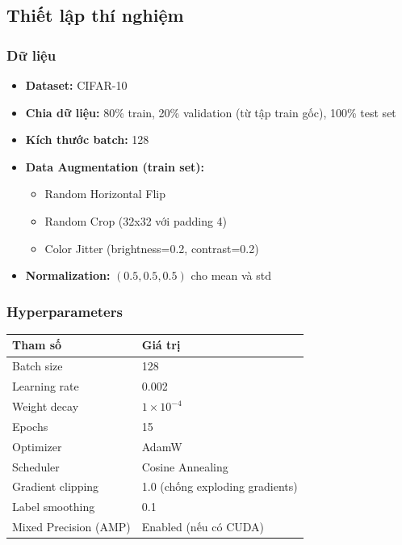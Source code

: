 \subsection{Thiết lập thí nghiệm}

\subsubsection{Dữ liệu}

\begin{itemize}
    \item \textbf{Dataset:} CIFAR-10
    \item \textbf{Chia dữ liệu:} 80\% train, 20\% validation (từ tập train gốc), 100\% test set
    \item \textbf{Kích thước batch:} 128
    \item \textbf{Data Augmentation (train set):}
    \begin{itemize}
        \item Random Horizontal Flip
        \item Random Crop (32x32 với padding 4)
        \item Color Jitter (brightness=0.2, contrast=0.2)
    \end{itemize}
    \item \textbf{Normalization:} $(0.5, 0.5, 0.5)$ cho mean và std
\end{itemize}

\subsubsection{Hyperparameters}

\begin{table}[H]
    \centering
    \begin{tabular}{ll}
        \toprule
        \textbf{Tham số} & \textbf{Giá trị} \\
        \midrule
        Batch size & 128 \\
        Learning rate & 0.002 \\
        Weight decay & $1 \times 10^{-4}$ \\
        Epochs & 15 \\
        Optimizer & AdamW \\
        Scheduler & Cosine Annealing \\
        Gradient clipping & 1.0 (chống exploding gradients) \\
        Label smoothing & 0.1 \\
        Mixed Precision (AMP) & Enabled (nếu có CUDA) \\
        \bottomrule
    \end{tabular}
\end{table}

